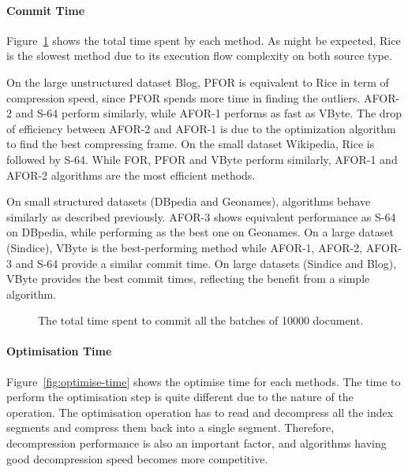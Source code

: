 \paragraph{Commit Time}

Figure~\ref{fig:commit-time} shows the total time spent by each method. As
might be expected, Rice is the slowest method due to its execution flow
complexity on both source type.

On the large unstructured dataset Blog, PFOR is equivalent to Rice in term of
compression speed, since PFOR spends more time in finding the outliers. AFOR-2
and S-64 perform similarly, while AFOR-1 performs as fast as VByte. The drop of
efficiency between AFOR-2 and AFOR-1 is due to the optimization algorithm to
find the best compressing frame. On the small dataset Wikipedia, Rice is
followed by S-64. While FOR, PFOR and VByte perform similarly, AFOR-1 and
AFOR-2 algorithms are the most efficient methods.

On small structured datasets (DBpedia and Geonames), algorithms behave
similarly as described previously. AFOR-3 shows equivalent performance as S-64
on DBpedia, while performing as the best one on Geonames. On a large dataset
(Sindice), VByte is the best-performing method while AFOR-1, AFOR-2, AFOR-3
and S-64 provide a similar commit time. On large datasets (Sindice and Blog),
VByte provides the best commit times, reflecting the benefit from a simple
algorithm.

\begin{figure}
  \centering
    \resizebox{0.8\linewidth}{!}{%
    
  }
\quad
  \resizebox{\linewidth}{!}{%
    
  }
	\caption{The total time spent to commit all the batches of 10000 document.}
	\label{fig:commit-time}
\end{figure}

\paragraph{Optimisation Time}

Figure~\ref{fig:optimise-time} shows the optimise time for each methods. The
time to perform the optimisation step is quite different due to the nature of
the operation. The optimisation operation has to read and decompress all the
index segments and compress them back into a single segment. Therefore,
decompression performance is also an important factor, and algorithms having
good decompression speed becomes more competitive.

